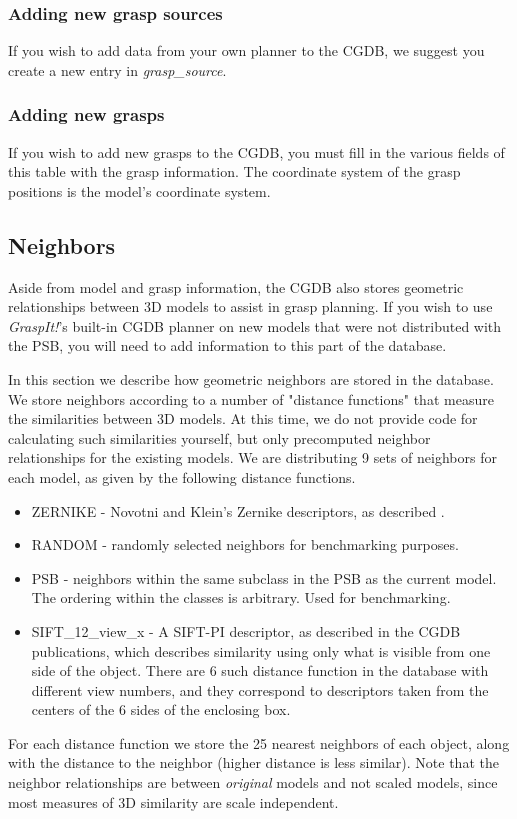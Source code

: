 \subsubsection{Adding new grasp sources}
If you wish to add data from your own planner to the CGDB, we suggest
you create a new entry in \emph{grasp\_source}.

\subsubsection{Adding new grasps}
If you wish to add new grasps to the CGDB, you must fill in the
various fields of this table with the grasp information. The
coordinate system of the grasp positions is the model's coordinate
system.


\subsection{Neighbors}
Aside from model and grasp information, the CGDB also stores geometric
relationships between 3D models to assist in grasp planning. If you
wish to use \emph{GraspIt!}'s built-in CGDB planner on new models that
were not distributed with the PSB, you will need to add information to
this part of the database.

In this section we describe how geometric neighbors are stored in the
database. We store neighbors according to a number of "distance
functions" that measure the similarities between 3D models. At this
time, we do not provide code for calculating such similarities
yourself, but only precomputed neighbor relationships for the existing
models. We are distributing 9 sets of neighbors for each model, as
given by the following distance functions.
\begin{itemize}
	\item ZERNIKE - Novotni and Klein's Zernike descriptors, as
      described
      .
	\item RANDOM - randomly selected neighbors for benchmarking
      purposes.
	\item PSB - neighbors within the same subclass in the PSB as the
      current model. The ordering within the classes is
      arbitrary. Used for benchmarking.
	\item SIFT\_12\_view\_x - A SIFT-PI descriptor, as described in
      the CGDB publications, which describes similarity using only
      what is visible from one side of the object. There are 6 such
      distance function in the database with different view numbers,
      and they correspond to descriptors taken from the centers of the
      6 sides of the enclosing box.
\end{itemize}
For each distance function we store the 25 nearest neighbors of each
object, along with the distance to the neighbor (higher distance is
less similar). Note that the neighbor relationships are between
\emph{original} models and not scaled models, since most measures of
3D similarity are scale independent.

